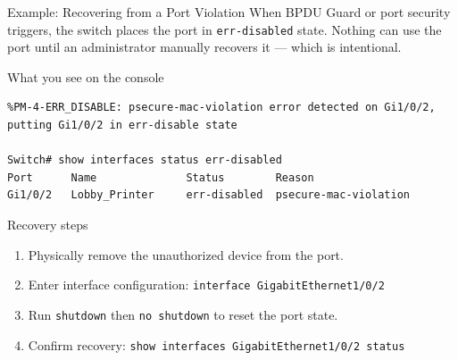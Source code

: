 \documentclass[aspectratio=169]{beamer}  %
\begin{document}
\begin{frame}[fragile]{Example: Recovering from a Port Violation}
    \footnotesize
    When BPDU Guard or port security triggers, the switch places the port in \texttt{err-disabled} state. Nothing can use the port until an administrator manually recovers it --- which is intentional.

    \vspace{0.4em}
    \begin{exampleblock}{What you see on the console}
        \scriptsize
\begin{verbatim}
%PM-4-ERR_DISABLE: psecure-mac-violation error detected on Gi1/0/2,
putting Gi1/0/2 in err-disable state

Switch# show interfaces status err-disabled
Port      Name              Status        Reason
Gi1/0/2   Lobby_Printer     err-disabled  psecure-mac-violation
\end{verbatim}
    \end{exampleblock}

    \begin{block}{Recovery steps}
        \footnotesize
        \begin{enumerate}
            \item Physically remove the unauthorized device from the port.
            \item Enter interface configuration: \texttt{interface GigabitEthernet1/0/2}
            \item Run \texttt{shutdown} then \texttt{no shutdown} to reset the port state.
            \item Confirm recovery: \texttt{show interfaces GigabitEthernet1/0/2 status}
        \end{enumerate}
    \end{block}
\end{frame}
\end{document}
